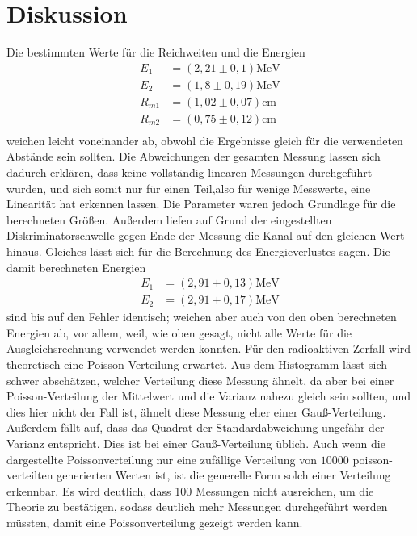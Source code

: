 \section{Diskussion}
\label{sec:Diskussion}

Die bestimmten Werte für die Reichweiten und die Energien
\begin{align*}
E_{1} &= (2,21 \pm 0,1) \si{\MeV}\\
E_{2} &= (1,8 \pm 0,19) \si{\MeV}\\
R_{m1} &= (1,02 \pm 0,07) \si{\centi\meter}\\
R_{m2} &= (0,75 \pm 0,12) \si{\centi\meter}\\
\end{align*}
weichen leicht voneinander ab, obwohl die Ergebnisse gleich für die verwendeten Abstände sein sollten.
Die Abweichungen der gesamten Messung lassen sich dadurch erklären, dass keine vollständig linearen Messungen durchgeführt wurden,
und sich somit nur für einen Teil,also für wenige Messwerte, eine Linearität hat erkennen lassen. Die Parameter waren jedoch Grundlage für die berechneten Größen.
Außerdem liefen auf Grund der eingestellten Diskriminatorschwelle gegen Ende der Messung die Kanal auf den gleichen Wert hinaus.
Gleiches lässt sich für die Berechnung des Energieverlustes sagen. Die damit berechneten Energien
\begin{align*}
E_1 &= (2,91 \pm 0,13) \si{\MeV}\\
E_2 &= (2,91 \pm 0,17) \si{\MeV}
\end{align*}
sind bis auf den Fehler identisch; weichen aber auch von den oben berechneten Energien ab, vor allem, weil, wie oben gesagt, nicht alle Werte für die Ausgleichsrechnung verwendet werden konnten. 
\noindent Für den radioaktiven Zerfall wird theoretisch eine Poisson-Verteilung erwartet. Aus dem Histogramm lässt sich schwer abschätzen, welcher Verteilung diese Messung ähnelt,
da aber bei einer Poisson-Verteilung der Mittelwert und die Varianz nahezu gleich sein sollten, und dies hier nicht der Fall ist, ähnelt diese Messung eher einer Gauß-Verteilung. 
Außerdem fällt auf, dass das Quadrat der Standardabweichung ungefähr der Varianz entspricht. Dies ist bei einer Gauß-Verteilung üblich.
Auch wenn die dargestellte Poissonverteilung nur eine zufällige Verteilung von $10000$ poisson-verteilten generierten Werten ist, ist 
die generelle Form solch einer Verteilung erkennbar. Es wird deutlich, dass
100 Messungen nicht ausreichen, um die Theorie zu bestätigen, sodass
deutlich mehr Messungen durchgeführt werden müssten, damit eine Poissonverteilung gezeigt werden kann.